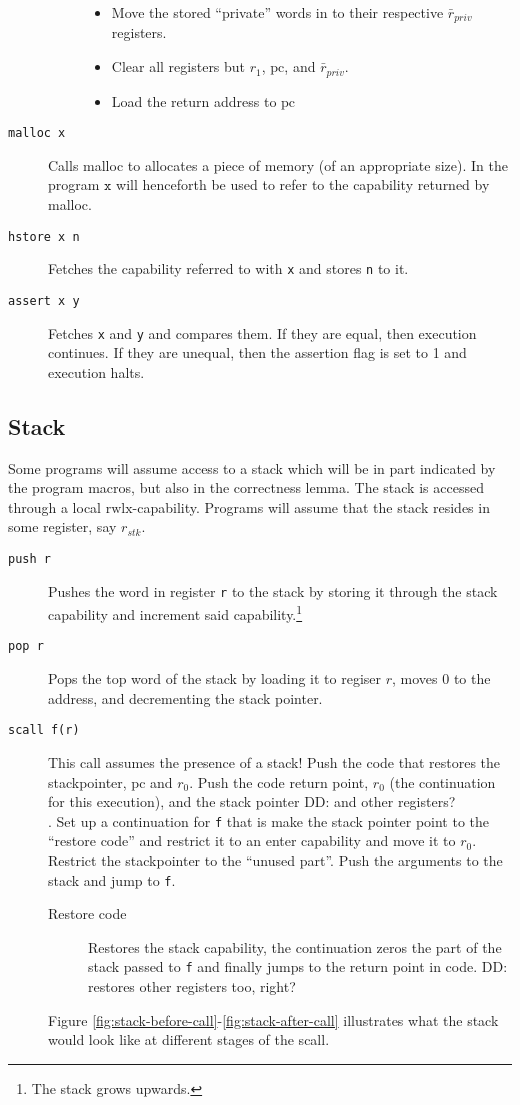 \documentclass[a4paper]{article}
\newcommand\dominique[1]{{\color{purple} \sf \footnotesize {DD: #1}}\\}
\newcommand{\var}[1]{\mathit{#1}}
\newcommand{\pcreg}{\mathrm{pc}}
\newcommand{\plainperm}[1]{\mathrm{#1}}
\newcommand{\rwlx}{\plainperm{rwlx}}
\begin{document}
\begin{description}
\begin{description}
    \begin{itemize}
    \item Move the stored ``private'' words in to their respective $\bar{r}_{\var{priv}}$ registers.
    \item Clear all registers but $r_1$, $\pcreg$, and $\bar{r}_{\var{priv}}$.
    \item Load the return address to $\pcreg$
    \end{itemize}
\end{description}
\item[\texttt{malloc x}] Calls malloc to allocates a piece of memory (of an appropriate size). In the program $\texttt{x}$ will henceforth be used to refer to the capability returned by malloc.
\item[\texttt{hstore x n}] Fetches the capability referred to with \texttt{x} and stores \texttt{n} to it.
\item[\texttt{assert x y}] Fetches \texttt{x} and \texttt{y} and compares them. If they are equal, then execution continues. If they are unequal, then the assertion flag is set to 1 and execution halts.
\end{description}

\subsection{Stack}
Some programs will assume access to a stack which will be in part indicated by the program macros, but also in the correctness lemma. The stack is accessed through a local $\rwlx$-capability. Programs will assume that the stack resides in some register, say $r_{\var{stk}}$.
\begin{description}
\item[\texttt{push r}] Pushes the word in register \texttt{r} to the stack by storing it through the stack capability and increment said capability.\footnote{The stack grows upwards.}
\item[\texttt{pop r}] Pops the top word of the stack by loading it to regiser $r$, moves 0 to the address, and decrementing the stack pointer.
\item[\texttt{scall f(r)}] This call assumes the presence of a stack! Push the code that restores the stackpointer, $\pcreg$ and $r_0$. Push the code return point, $r_0$ (the continuation for this execution), and the stack pointer \dominique{and other registers?} . Set up a continuation for \texttt{f} that is make the stack pointer point to the ``restore code'' and restrict it to an enter capability and move it to $r_0$. Restrict the stackpointer to the ``unused part''. Push the arguments to the stack and jump to \texttt{f}.
  \begin{description}
  \item[Restore code] Restores the stack capability, the continuation zeros the part of the stack passed to \texttt{f} and finally jumps to the return point in code. \dominique{restores other registers too, right?}
  \end{description}
Figure \ref{fig:stack-before-call}-\ref{fig:stack-after-call} illustrates what the stack would look like at different stages of the scall.
\end{description}
\end{document}
